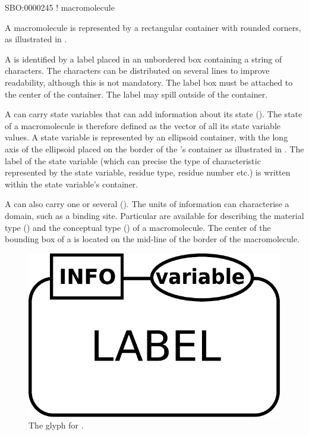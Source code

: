 \begin{glyphDescription}

\glyphSboTerm SBO:0000245 ! macromolecule 

\glyphContainer A macromolecule is represented by a rectangular container with rounded corners, as illustrated in .

\glyphLabel A  is identified by a label placed in an unbordered box containing a string of characters.  The characters can be distributed on several lines to improve readability, although this is not mandatory.  The label box must be attached to the center of the container.  The label may spill outside of the container.

\glyphAux A  can carry state variables that can add information about its state ().  The state of a macromolecule is therefore defined as the vector of all its state variable values.  A state variable is represented by an ellipsoid container, with the long axis of the ellipsoid placed on the border of the 's container as illustrated in .  The label of the state variable (which can precise the type of characteristic represented by the state variable, residue type, residue number etc.) is written within the state variable's container.

A  can also carry one or several  ().  The units of information can characterise a domain, such as a binding site.  Particular  are available for describing the material type () and the conceptual type () of a macromolecule.  The center of the bounding box of a  is located on the mid-line of the border of the macromolecule.

\end{glyphDescription}

\begin{figure}[H]
  \centering
  \includegraphics[scale = 0.3]{images/macromolecule}
  \caption{The \ER glyph for .}
  \label{fig:macromolecule}
\end{figure}

\normalcolor

